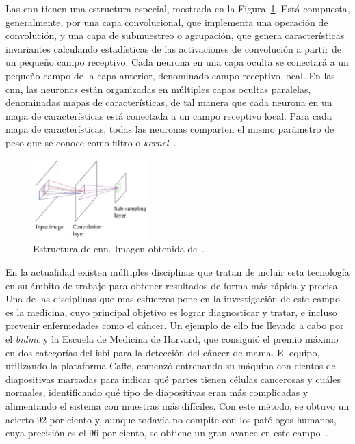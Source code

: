 Las \acrshort{cnn} tienen una estructura especial, mostrada en la Figura~\ref{fig.cnn}. Está compuesta, generalmente, por una capa convolucional, que implementa una operación de convolución, y una capa de submuestreo o agrupación, que genera características invariantes calculando estadísticas de las activaciones de convolución a partir de un pequeño campo receptivo. Cada neurona en una capa oculta se conectará a un pequeño campo de la capa anterior, denominado campo receptivo local. En las \acrshort{cnn}, las neuronas están organizadas en múltiples capas ocultas paralelas, denominadas mapas de características, de tal manera que cada neurona en un mapa de características está conectada a un campo receptivo local. Para cada mapa de características, todas las neuronas comparten el mismo parámetro de peso que se conoce como filtro o \textit{kernel}~\cite{cnn}.

\begin{figure}[H]
	\begin{center}
		\includegraphics[width=0.4\textwidth]{figures/cnn}
		\caption{Estructura de \acrshort{cnn}. Imagen obtenida de~\cite{cnn}.}
		\label{fig.cnn}
	\end{center}
\end{figure}

En la actualidad existen múltiples disciplinas que tratan de incluir esta tecnología en su ámbito de trabajo para obtener resultados de forma más rápida y precisa. Una de las disciplinas que mas esfuerzos pone en la investigación de este campo es la medicina, cuyo principal objetivo es lograr diagnosticar y tratar, e incluso prevenir enfermedades como el cáncer. Un ejemplo de ello fue llevado a cabo por el \textit{\acrfull{bidmc}} y la Escuela de Medicina de Harvard, que consiguió el premio máximo en dos categorías del \acrfull{isbi} para la detección del cáncer de mama. El equipo, utilizando la plataforma Caffe, comenzó entrenando su máquina con cientos de diapositivas marcadas para indicar qué partes tienen células cancerosas y cuáles normales, identificando qué tipo de diapositivas eran más complicadas y alimentando el sistema con muestras más difíciles. Con este método, se obtuvo un acierto 92 por ciento y, aunque todavía no compite con los patólogos humanos, cuya precisión es el 96 por ciento, se obtiene un gran avance en este campo~\cite{2016arXiv160605718W}.\\

